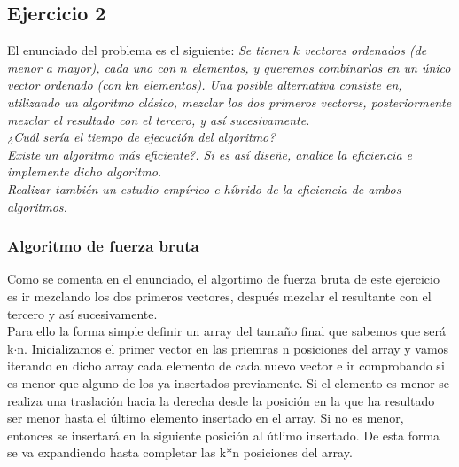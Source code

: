\documentclass[10pt,a4paper]{article}
\begin{document}
\subsection{Ejercicio 2}
El enunciado del problema es el siguiente: \textit{Se tienen \(k\) vectores ordenados (de menor a mayor), cada uno con \(n\) elementos, y queremos combinarlos
en un único vector ordenado (con \(kn\) elementos). Una posible alternativa consiste en, utilizando un algoritmo clásico, mezclar los dos primeros vectores, posteriormente mezclar el resultado con el tercero, y así sucesivamente.}
\\
\textit{¿Cuál sería el tiempo de ejecución del algoritmo?}
\\
\textit{Existe un algoritmo más eficiente?. Si es así diseñe, analice la eficiencia e implemente dicho algoritmo.}
\\
\textit{Realizar también un estudio empírico e híbrido de la eficiencia de ambos algoritmos.}
\subsubsection{Algoritmo de fuerza bruta}
Como se comenta en el enunciado, el algortimo de fuerza bruta de este ejercicio es ir mezclando los dos primeros vectores, después mezclar el resultante con el tercero y así sucesivamente. \\

Para ello la forma simple definir un array del tamaño final que sabemos que será k$\cdot$n. Inicializamos el primer vector en las priemras n posiciones del array y vamos iterando en dicho array cada elemento de cada nuevo vector e ir comprobando si es menor que alguno de los ya insertados previamente. Si el elemento es menor se realiza una traslación hacia la derecha desde la posición en la que ha resultado ser menor hasta el último elemento insertado en el array. Si no es menor, entonces se insertará en la siguiente posición al útlimo insertado. De esta forma se va expandiendo hasta completar las k*n posiciones del array.
\\
\end{document}
